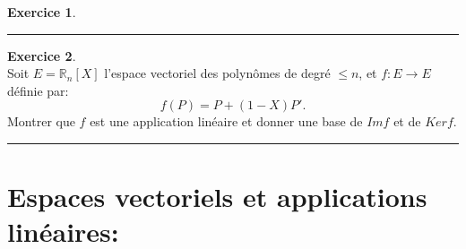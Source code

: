 \documentclass[a4paper,10pt]{article}
\theoremstyle{definition}
\theoremstyle{definition}
\newtheorem{exo}{Exercice}
\newcommand{\R}{\mathbb{R}}
\begin{document}
\begin{minipage}{1\linewidth}
\begin{minipage}[t]{0.48\linewidth}
\begin{exo}
		\centering
		\rule{1\linewidth}{0.6pt}
	\end{exo}

\begin{exo}\quad\\
	Soit $E={\R}_{n}[X]$ l'espace vectoriel des polyn\^{o}mes de degr\'{e} $%
	\leq n$, et $f:E\rightarrow E$ d\'{e}finie par:
	$$f(P)=P+(1-X)P'. $$
	Montrer que $f$ est une application linéaire et donner une base de $Im f$ et de $Ker f.$
	
	\centering
	\rule{1\linewidth}{0.6pt}
\end{exo}



	
	\end{minipage}
\end{minipage}
\newpage
\section*{Espaces vectoriels et applications linéaires:}\hfill\\\hfill\\
\end{document}
